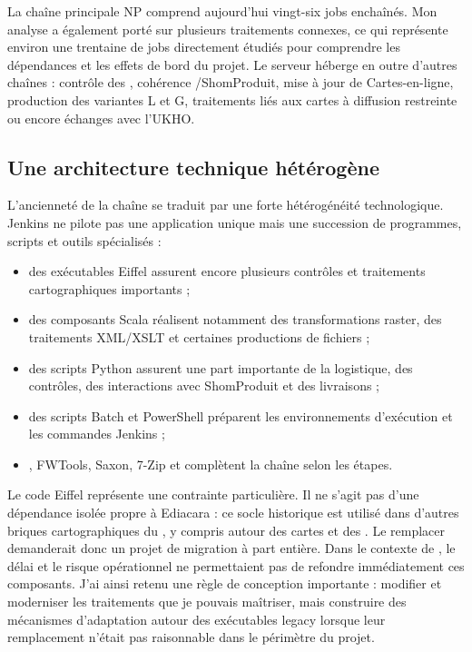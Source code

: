 La chaîne principale NP comprend aujourd'hui vingt-six jobs enchaînés. Mon analyse a également porté sur plusieurs traitements connexes, ce qui représente environ une trentaine de jobs directement étudiés pour comprendre les dépendances et les effets de bord du projet. Le serveur héberge en outre d'autres chaînes : contrôle des , cohérence /ShomProduit, mise à jour de Cartes-en-ligne, production des variantes L et G, traitements liés aux cartes à diffusion restreinte ou encore échanges avec l'UKHO.

\subsection{Une architecture technique hétérogène}

L'ancienneté de la chaîne se traduit par une forte hétérogénéité technologique. Jenkins ne pilote pas une application unique mais une succession de programmes, scripts et outils spécialisés :

\begin{itemize}
    \item des exécutables Eiffel assurent encore plusieurs contrôles et traitements cartographiques importants ;
    \item des composants Scala réalisent notamment des transformations raster, des traitements XML/XSLT et certaines productions de fichiers ;
    \item des scripts Python assurent une part importante de la logistique, des contrôles, des interactions avec ShomProduit et des livraisons ;
    \item des scripts Batch et PowerShell préparent les environnements d'exécution et les commandes Jenkins ;
    \item {}, FWTools, Saxon, 7-Zip et  complètent la chaîne selon les étapes.
\end{itemize}

Le code Eiffel représente une contrainte particulière. Il ne s'agit pas d'une dépendance isolée propre à Ediacara : ce socle historique est utilisé dans d'autres briques cartographiques du , y compris autour des cartes et des . Le remplacer demanderait donc un projet de migration à part entière. Dans le contexte de , le délai et le risque opérationnel ne permettaient pas de refondre immédiatement ces composants. J'ai ainsi retenu une règle de conception importante : modifier et moderniser les traitements que je pouvais maîtriser, mais construire des mécanismes d'adaptation autour des exécutables legacy lorsque leur remplacement n'était pas raisonnable dans le périmètre du projet.

